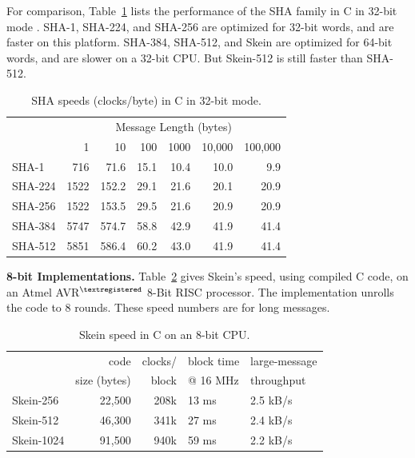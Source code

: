 \documentclass[11pt,twoside]{article}
\begin{document}
For comparison, Table~\ref{tab:SHAC32Speed} lists the performance of the SHA family in C in 32-bit mode \cite{G08a,G08b}.  SHA-1, SHA-224, and SHA-256 are optimized for 32-bit words, and are faster on this platform.  SHA-384, SHA-512, and Skein are optimized for 64-bit words, and are slower on a 32-bit CPU.  But Skein-512 is still faster than SHA-512.
%
\begin{table}[htb]
  \begin{center}
    \begin{tabular}{|l|rrrrrr|}
    \hline
    & \multicolumn{6}{c|}{Message Length (bytes)}\\
    & 1  & 10 &  100 & 1000 & 10,000 & 100,000\\
    \hline
    SHA-1    &  716 &  71.6 & 15.1 & 10.4 & 10.0 &  9.9 \\
    SHA-224  & 1522 & 152.2 & 29.1 & 21.6 & 20.1 & 20.9 \\
    SHA-256  & 1522 & 153.5 & 29.5 & 21.6 & 20.9 & 20.9 \\
    SHA-384  & 5747 & 574.7 & 58.8 & 42.9 & 41.9 & 41.4 \\
    SHA-512  & 5851 & 586.4 & 60.2 & 43.0 & 41.9 & 41.4 \\
    \hline
    \end{tabular}
   \end{center}\caption{SHA speeds (clocks/byte) in C in 32-bit mode.}
  \label{tab:SHAC32Speed}
\end{table}
%

{\bf 8-bit Implementations.}  Table~\ref{tab:SkeinC8Speed} gives Skein's speed, using compiled C code, on an Atmel AVR$^{\textregistered}$ 8-Bit RISC processor.  The implementation unrolls the code to 8 rounds.  These speed numbers are for long messages.
%
\begin{table}[htb]
  \begin{center}
    \begin{tabular}{|l|rrll|}
    \hline
               & code         & clocks/ & block time & large-message \\
               & size (bytes) & block   & @ 16 MHz  & throughput \\
    \hline
    Skein-256  &  22,500 & 208k   & 13 ms    &  2.5 kB/s \\
    Skein-512  &  46,300 & 341k   & 27 ms    &  2.4 kB/s \\
    Skein-1024 &  91,500 & 940k   & 59 ms    &  2.2 kB/s \\
    \hline
    \end{tabular}
  \end{center}
  \caption{Skein speed in C on an 8-bit CPU.}
  \label{tab:SkeinC8Speed}
\end{table}
\end{document}
